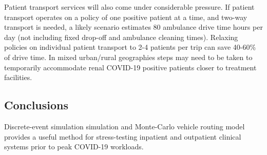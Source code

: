 Patient transport services will also come under considerable pressure. If patient transport operates on a policy of one positive patient at a time, and two-way transport is needed, a likely scenario estimates 80 ambulance drive time hours per day (not including fixed drop-off and ambulance cleaning times). Relaxing policies on individual patient transport to 2-4 patients per trip can save 40-60\% of drive time. In mixed urban/rural geographies steps may need to be taken to temporarily accommodate renal COVID-19 positive patients closer to treatment facilities.

\subsection*{Conclusions}
Discrete-event simulation simulation and Monte-Carlo vehicle routing model provides a useful method for stress-testing inpatient and outpatient clinical systems prior to peak COVID-19 workloads. 